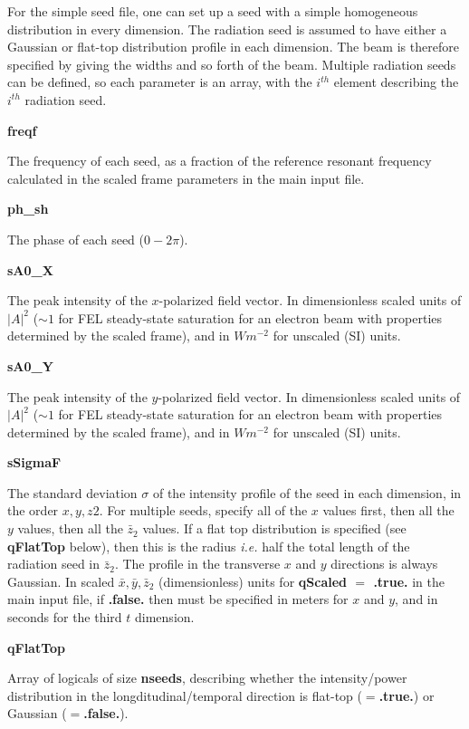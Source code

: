 \documentclass[12pt]{article}%
\begin{document}
For the simple seed file, one can set up a seed with a simple homogeneous distribution in every dimension. The radiation seed is assumed to have either a Gaussian or flat-top distribution profile in each dimension. The beam is therefore specified by giving the widths and so forth of the beam. Multiple radiation seeds can be defined, so each parameter is an array, with the $i^{th}$ element describing the $i^{th}$ radiation seed.


{\bf freqf}

The frequency of each seed, as a fraction of the reference resonant frequency calculated in the scaled frame parameters in the main input file.

{\bf ph\_sh}

The phase of each seed ($0-2\pi$).

{\bf sA0\_X}

The peak intensity of the $x$-polarized field vector. In dimensionless scaled units of $|A|^2$ ($\sim 1$ for FEL steady-state saturation for an electron beam with properties determined by the scaled frame), and in $Wm^{-2}$ for unscaled (SI) units.

{\bf sA0\_Y}

The peak intensity of the $y$-polarized field vector. In dimensionless scaled units of $|A|^2$ ($\sim 1$ for FEL steady-state saturation for an electron beam with properties determined by the scaled frame), and in $Wm^{-2}$ for unscaled (SI) units.

{\bf sSigmaF}

The standard deviation $\sigma$ of the intensity profile of the seed in each dimension, in the order $x, y, z2$. For multiple seeds, specify all of the $x$ values first, then all the $y$ values, then all the $\bar{z}_2$ values. If a flat top distribution is specified (see {\bf qFlatTop} below), then this is the radius \textit{i.e.} half the total length of the radiation seed in $\bar{z}_2$. The profile in the transverse $x$ and $y$ directions is always Gaussian. In scaled $\bar{x}, \bar{y}, \bar{z}_2$ (dimensionless) units for {\bf qScaled $=$ .true.} in the main input file, if {\bf .false.} then must be specified in meters for $x$ and $y$, and in seconds for the third $t$ dimension.


{\bf qFlatTop}

Array of logicals of size {\bf nseeds}, describing whether the intensity/power distribution in the longditudinal/temporal direction is flat-top ($=${\bf .true.}) or Gaussian ($=${\bf .false.}).
\end{document}
